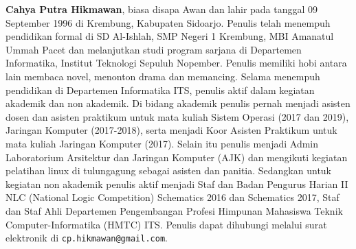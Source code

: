 \documentclass[12pt,oneside,reqno]{ta-its}
\begin{document}
	\textbf{Cahya Putra Hikmawan}, biasa disapa Awan dan lahir pada tanggal 09 September 1996 di Krembung, Kabupaten Sidoarjo. Penulis telah menempuh pendidikan formal di SD Al-Ishlah, SMP Negeri 1 Krembung, MBI Amanatul Ummah Pacet dan melanjutkan studi program sarjana di Departemen Informatika, Institut Teknologi Sepuluh Nopember. Penulis memiliki hobi antara lain membaca novel, menonton drama dan memancing. Selama menempuh pendidikan di Departemen Informatika ITS, penulis aktif dalam kegiatan akademik dan non akademik. Di bidang akademik penulis pernah menjadi asisten dosen dan asisten praktikum untuk mata kuliah Sistem Operasi (2017 dan 2019), Jaringan Komputer (2017-2018), serta menjadi Koor Asisten Praktikum untuk mata kuliah Jaringan Komputer (2017). Selain itu penulis menjadi Admin Laboratorium Arsitektur dan Jaringan Komputer (AJK) dan mengikuti kegiatan pelatihan linux di tulungagung sebagai asisten dan panitia. Sedangkan untuk kegiatan non akademik penulis aktif  menjadi Staf dan Badan Pengurus Harian II NLC (National Logic Competition) Schematics 2016 dan Schematics 2017, Staf dan Staf Ahli Departemen Pengembangan Profesi Himpunan Mahasiswa Teknik Computer-Informatika (HMTC) ITS. Penulis dapat dihubungi melalui surat elektronik di \texttt{cp.hikmawan@gmail.com}.
\end{document}
